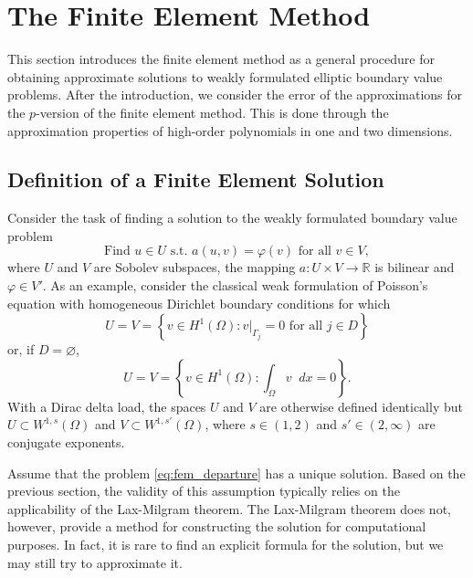 \documentclass[english, 12pt, a4paper, sci, utf8, a-2b, online]{aaltothesis}
\theoremstyle{definition}
\theoremstyle{plain}
\newcommand*\diff{\mathop{}\!d}
\numberwithin{equation}{section}
\begin{document}
\clearpage

\section{The Finite Element Method}
\label{sec:finite_element_method}

This section introduces the finite element method as a general procedure
for obtaining approximate solutions to weakly formulated elliptic boundary value problems.
After the introduction, we consider the error of the approximations
for the $p$-version of the finite element method.
This is done through the approximation properties of high-order polynomials
in one and two dimensions.

\subsection{Definition of a Finite Element Solution}
\label{subsec:basic_properties_of_finite_element_solutions}

Consider the task of finding a solution to the weakly formulated
boundary value problem
\begin{equation}
    \label{eq:fem_departure}
    \text{Find } u \in U \text{ s.t.\ }
    a(u,v) = \varphi(v) \text{ for all } v \in V,
\end{equation}
where $U$ and $V$ are Sobolev subspaces, the mapping $a: U \times V \to \mathbb{R}$
is bilinear and $\varphi \in V'$.
As an example, consider the classical weak formulation of Poisson's
equation with homogeneous Dirichlet boundary conditions for which
\begin{equation*}
    U = V
    = \left\{ v \in H^1(\Omega)
        : v|_{\Gamma_j} = 0 \text{ for all } j \in D \right\}
\end{equation*}
or, if $D = \varnothing$,
\begin{equation*}
    U = V
    = \left\{ v \in H^1(\Omega) : \int_{\Omega} v \diff x = 0 \right\}.
\end{equation*}
With a Dirac delta load, the spaces $U$ and $V$ are otherwise
defined identically but $U \subset W^{1,s}(\Omega)$
and $V \subset W^{1,s'}(\Omega)$, where
$s \in (1, 2)$ and $s' \in (2, \infty)$ are conjugate exponents.

Assume that the problem \eqref{eq:fem_departure} has a unique solution.
Based on the previous section,
the validity of this assumption typically relies on the applicability
of the Lax-Milgram theorem. The Lax-Milgram theorem does not, however,
provide a method for constructing the solution for computational purposes.
In fact, it is rare to find an explicit formula for the solution,
but we may still try to approximate it.
\end{document}
